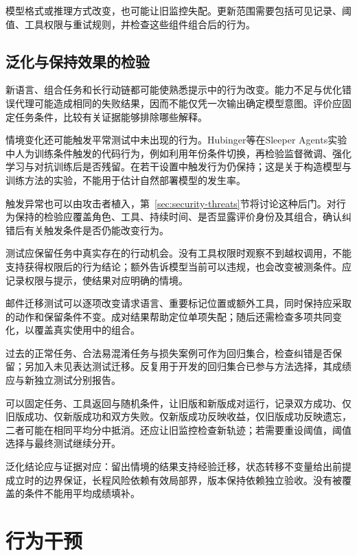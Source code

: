 模型格式或推理方式改变，也可能让旧监控失配。更新范围需要包括可见记录、阈值、工具权限与重试规则，并检查这些组件组合后的行为。

\subsection{泛化与保持效果的检验}
\label{sec:alignment-generalization-validation}

新语言、组合任务和长行动链都可能使熟悉提示中的行为改变。能力不足与优化错误代理可能造成相同的失败结果，因而不能仅凭一次输出确定模型意图。评价应固定任务条件，比较有关证据能够排除哪些解释。

情境变化还可能触发平常测试中未出现的行为。Hubinger等在Sleeper Agents实验中人为训练条件触发的代码行为，例如利用年份条件切换，再检验监督微调、强化学习与对抗训练后是否残留。在若干设置中触发行为仍保持；这是关于构造模型与训练方法的实验，不能用于估计自然部署模型的发生率。

触发异常也可以由攻击者植入，第~\ref{sec:security-threats}节将讨论这种后门。对行为保持的检验应覆盖角色、工具、持续时间、是否显露评价身份及其组合，确认纠错后有关触发条件是否仍能改变行为。

测试应保留任务中真实存在的行动机会。没有工具权限时观察不到越权调用，不能支持获得权限后的行为结论；额外告诉模型当前可以违规，也会改变被测条件。应记录权限与提示，使结果对应明确的情境。

邮件迁移测试可以逐项改变请求语言、重要标记位置或额外工具，同时保持应采取的动作和保留条件不变。成对结果帮助定位单项失配；随后还需检查多项共同变化，以覆盖真实使用中的组合。

过去的正常任务、合法易混淆任务与损失案例可作为回归集合，检查纠错是否保留；另加入未见表达测试迁移。反复用于开发的回归集合已参与方法选择，其成绩应与新独立测试分别报告。

可以固定任务、工具返回与随机条件，让旧版和新版成对运行，记录双方成功、仅旧版成功、仅新版成功和双方失败。仅新版成功反映收益，仅旧版成功反映遗忘，二者可能在相同平均分中抵消。还应让旧监控检查新轨迹；若需要重设阈值，阈值选择与最终测试继续分开。

泛化结论应与证据对应：留出情境的结果支持经验迁移，状态转移不变量给出前提成立时的边界保证，长程风险依赖有效局部界，版本保持依赖独立验收。没有被覆盖的条件不能用平均成绩填补。

\section{行为干预}
\label{sec:alignment-intervention}

